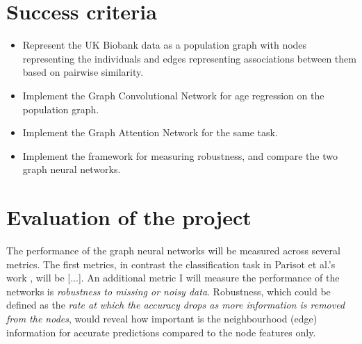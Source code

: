 \documentclass[12pt,a4paper,twoside]{article}
\begin{document}
\section*{Success criteria}
\begin{itemize}
  \item Represent the UK Biobank data as a population graph with nodes representing the individuals and edges representing associations between them based on pairwise similarity.
  \item Implement the Graph Convolutional Network for age regression on the population graph.
  \item Implement the Graph Attention Network for the same task.
  \item Implement the framework for measuring robustness, and compare the two graph neural networks.
\end{itemize}

\section*{Evaluation of the project}
The performance of the graph neural networks will be measured across several metrics. The first metrics, in contrast the classification task in Parisot et al.'s work \cite{parisot2018disease}, will be [...]. An additional metric I will measure the performance of the networks is \textit{robustness to missing or noisy data}. Robustness, which could be defined as the \textit{rate at which the accuracy drops as more information is removed from the nodes}, would reveal how important is the neighbourhood (edge) information for accurate predictions compared to the node features only.
\end{document}
